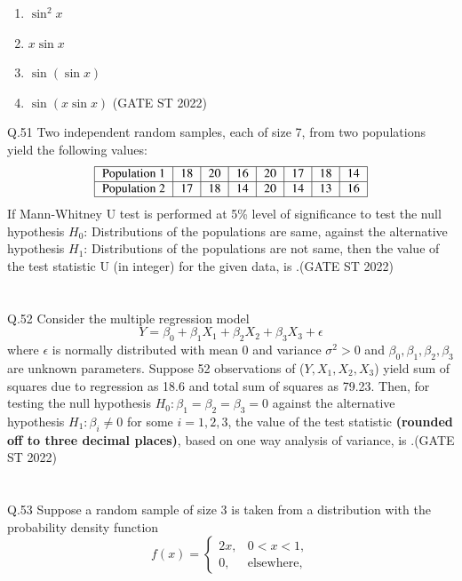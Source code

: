 \documentclass[journal,12pt,onecolumn]{IEEEtran}
\theoremstyle{remark}
\begin{document}
\begin{enumerate}[label=\Alph*.] 
	\item $\sin^2 x$
	\item $x \sin x$
	\item $\sin(\sin x)$
	\item $\sin(x \sin x)$
	\hfill (GATE ST 2022)
\end{enumerate}
	\vspace{2em}
Q.51 Two independent random samples, each of size 7, from two populations yield the following values:
\[
\begin{tabular}{|c|c|c|c|c|c|c|c|}
	\hline
	Population 1 & 18 & 20 & 16 & 20 & 17 & 18 & 14 \\
	\hline
	Population 2 & 17 & 18 & 14 & 20 & 14 & 13 & 16 \\
	\hline
\end{tabular} 
\]
If Mann-Whitney U test is performed at 5\% level of significance to test the null hypothesis $H_0$: Distributions of the populations are same, against the alternative hypothesis $H_1$: Distributions of the populations are not same, then the value of the test statistic U (in integer) for the given data, is \underline{\hspace{2cm}}.\hfill (GATE ST 2022)\\
\\
\\
Q.52 Consider the multiple regression model
\[
Y = \beta_0 + \beta_1X_1 + \beta_2X_2 + \beta_3X_3 + \epsilon
\]
where $\epsilon$ is normally distributed with mean 0 and variance $\sigma^2 > 0$ and $\beta_0, \beta_1, \beta_2, \beta_3$ are unknown parameters. Suppose 52 observations of ($Y, X_1, X_2, X_3$) yield sum of squares due to regression as 18.6 and total sum of squares as 79.23. Then, for testing the null hypothesis $H_0: \beta_1 = \beta_2 = \beta_3 = 0$ against the alternative hypothesis $H_1: \beta_i \neq 0$ for some $i = 1, 2, 3$, the value of the test statistic \textbf{(rounded off to three decimal places)}, based on one way analysis of variance, is \underline{\hspace{2cm}}.\hfill (GATE ST 2022)\\
\\
\\
Q.53 Suppose a random sample of size 3 is taken from a distribution with the probability density function 
\[
f(x) = \begin{cases}
	2x, & 0 < x < 1, \\
	0, & \text{elsewhere},
\end{cases}
\]
\end{document}
